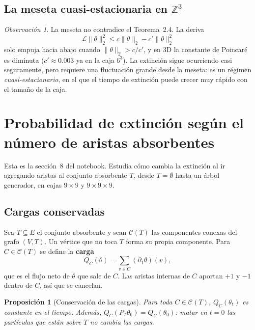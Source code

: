 \documentclass[11pt,a4paper]{article}
\theoremstyle{plain}
\newtheorem{proposicion}{Proposición}[section]
\theoremstyle{remark}
\newtheorem*{observacion}{Observación}
\newcommand{\Z}{\mathbb{Z}}
\newcommand{\Lgen}{\mathcal{L}}
\newcommand{\norm}[1]{\lVert #1\rVert}
\begin{document}
\subsection{La meseta cuasi-estacionaria en \texorpdfstring{$\Z^3$}{Z3}}

\begin{observacion}
La meseta no contradice el Teorema~2.4. La deriva
\[
\Lgen\norm{\theta}_2^2\le c\norm{\theta}_2-c'\norm{\theta}_2^2
\]
solo empuja hacia abajo cuando $\norm{\theta}_2>c/c'$, y en 3D la constante de Poincaré es diminuta ($c'\approx0.003$ ya en la caja $6^3$). La extinción sigue ocurriendo casi seguramente, pero requiere una fluctuación grande desde la meseta: es un régimen \emph{cuasi-estacionario}, en el que el tiempo de extinción puede crecer muy rápido con el tamaño de la caja.
\end{observacion}

\section{Probabilidad de extinción según el número de aristas absorbentes}\label{sec:aristas}

Esta es la sección~8 del notebook. Estudia cómo cambia la extinción al ir agregando aristas al conjunto absorbente $T$, desde $T=\emptyset$ hasta un árbol generador, en cajas $9\times9$ y $9\times9\times9$.

\subsection{Cargas conservadas}

Sea $T\subseteq E$ el conjunto absorbente y sean $\mathcal C(T)$ las componentes conexas del grafo $(V,T)$. Un vértice que no toca $T$ forma su propia componente. Para $C\in\mathcal C(T)$ se define la \textbf{carga}
\[
Q_C(\theta)=\sum_{v\in C}(\partial_1\theta)(v),
\]
que es el flujo neto de $\theta$ que sale de $C$. Las aristas internas de $C$ aportan $+1$ y $-1$ dentro de $C$, así que se cancelan.

\begin{proposicion}[Conservación de las cargas]\label{prop:cargas}
Para toda $C\in\mathcal C(T)$, $Q_C(\theta_t)$ es constante en el tiempo. Además, $Q_C(P_T\theta_0)=Q_C(\theta_0)$: matar en $t=0$ las partículas que están sobre $T$ no cambia las cargas.
\end{proposicion}
\end{document}
